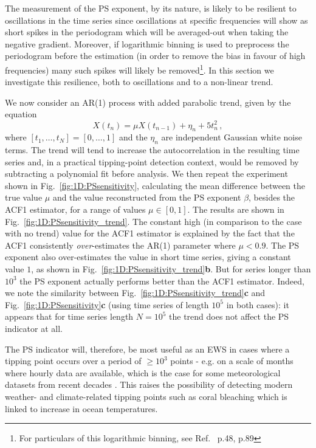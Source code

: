 \documentclass[10pt]{iopart}
\newcommand{\revision}[1]{\color{red} {#1}}
\begin{document}
The measurement of the PS exponent, by its nature, is likely to be resilient to oscillations in the time series since oscillations at specific frequencies will show as short spikes in the periodogram which will be averaged-out when taking the negative gradient. Moreover, if logarithmic binning is used to preprocess the periodogram before the estimation (in order to remove the bias in favour of high frequencies) many such spikes will likely be removed\footnote{For particulars of this logarithmic binning, see Ref.~\cite{prettyman2021} p.48, p.89}. In this section we investigate this resilience, both to oscillations and to a non-linear trend. 

We now consider an AR(1) process with added parabolic trend, given by the equation 
\begin{equation}
	X(t_{n}) = \mu X(t_{n-1}) + \eta_n + 5t_n^2\,,
\end{equation} 
where $[t_1,\dots,t_N] = [0,\dots,1]$ and the $\eta_n$ are independent Gaussian white noise terms. The trend will tend to increase the autocorrelation in the resulting time series and, in a practical tipping-point detection context, would be removed by subtracting a polynomial fit before analysis. We then repeat the experiment shown in Fig.~\ref{fig:1D:PSsensitivity}, calculating the mean difference between the true value $\mu$ and the value reconstructed from the PS exponent $\beta$, besides the ACF1 estimator, for a range of values $\mu\in[0,1]$. The results are shown in Fig.~\ref{fig:1D:PSsensitivity_trend}. The constant high (in comparison to the case with no trend) value for the ACF1 estimator is explained by the fact that the ACF1 consistently \emph{over}-estimates the AR(1) parameter where $\mu<0.9$. The PS exponent also over-estimates the value in short time series, giving a constant value $1$, as shown in Fig.~\ref{fig:1D:PSsensitivity_trend}{\bf b}. But for series longer than $10^3$ the PS exponent actually performs better than the ACF1 estimator. Indeed, we note the similarity between Fig.~\ref{fig:1D:PSsensitivity_trend}{\bf c} and Fig.~\ref{fig:1D:PSsensitivity}{\bf c} (using time series of length $10^5$ in both cases): it appears that for time series length $N=10^5$ the trend does not affect the PS indicator at all. 

{\revision The PS indicator will, therefore, be most useful as an EWS in cases where a tipping point occurs over a period of $\geq 10^3$ points - e.g. on a scale of months where
	hourly data are available, which is the case for some meteorological datasets from recent decades \cite{HadISD, NOAAcoralreefdatabase}. This raises the possibility of detecting modern weather- and climate-related tipping points such as coral bleaching \cite{hoegh2007coral, goreau2021global} which is linked to increase in ocean temperatures. }
\end{document}

